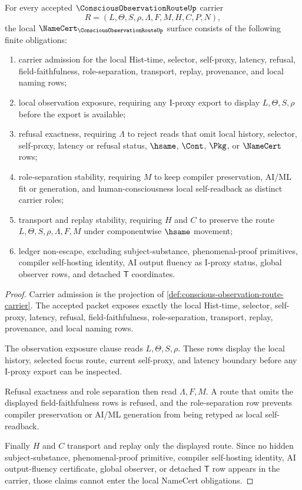 \begin{theorem}
\label{thm:conscious-observation-route-namecert-obligations}
For every accepted $\ConsciousObservationRouteUp$ carrier
$$
R=(L,\Theta,S,\rho,\Lambda,F,M,H,C,P,N),
$$
the local $\NameCert_{\ConsciousObservationRouteUp}$ surface consists of the following finite obligations:
\begin{enumerate}
\item carrier admission for the local Hist-time, selector, self-proxy, latency, refusal, field-faithfulness, role-separation, transport, replay, provenance, and local naming rows;
\item local observation exposure, requiring any I-proxy export to display $L,\Theta,S,\rho$ before the export is available;
\item refusal exactness, requiring $\Lambda$ to reject reads that omit local history, selector, self-proxy, latency or refusal status, $\hsame$, $\Cont$, $\Pkg$, or $\NameCert$ rows;
\item role-separation stability, requiring $M$ to keep compiler preservation, AI/ML fit or generation, and human-consciousness local self-readback as distinct carrier roles;
\item transport and replay stability, requiring $H$ and $C$ to preserve the route $L,\Theta,S,\rho,\Lambda,F,M$ under componentwise $\hsame$ movement;
\item ledger non-escape, excluding subject-substance, phenomenal-proof primitives, compiler self-hosting identity, AI output fluency as I-proxy status, global observer rows, and detached $\mathsf{T}$ coordinates.
\end{enumerate}
\end{theorem}
\begin{proof}
Carrier admission is the projection of \autoref{def:conscious-observation-route-carrier}. The accepted packet exposes exactly the local Hist-time, selector, self-proxy, latency, refusal, field-faithfulness, role-separation, transport, replay, provenance, and local naming rows.

The observation exposure clause reads $L,\Theta,S,\rho$. These rows display the local history, selected focus route, current self-proxy, and latency boundary before any I-proxy export can be inspected.

Refusal exactness and role separation then read $\Lambda,F,M$. A route that omits the displayed field-faithfulness rows is refused, and the role-separation row prevents compiler preservation or AI/ML generation from being retyped as local self-readback.

Finally $H$ and $C$ transport and replay only the displayed route. Since no hidden subject-substance, phenomenal-proof primitive, compiler self-hosting identity, AI output-fluency certificate, global observer, or detached $\mathsf{T}$ row appears in the carrier, those claims cannot enter the local NameCert obligations.
\end{proof}

